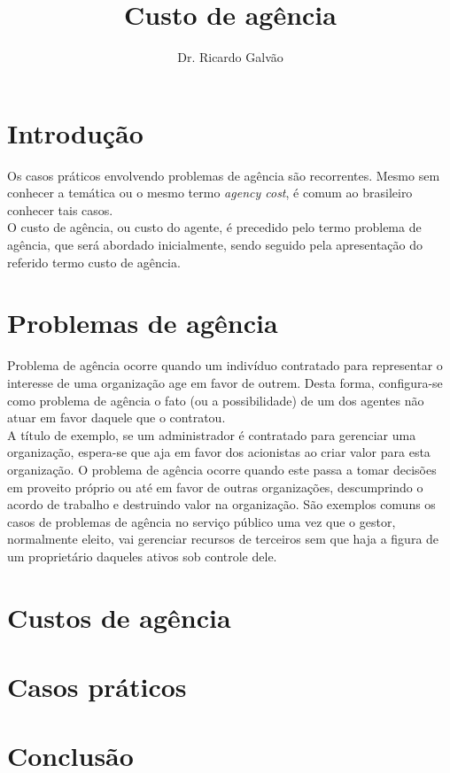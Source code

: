\documentclass[jou,apacite]{apa6}
\title{Custo de agência}
\author{Dr. Ricardo Galvão}
\affiliation{https://github.com/rcgalvao/financas}
\begin{document}
\maketitle    
                        
\section{Introdução}
Os casos práticos envolvendo problemas de agência são recorrentes. Mesmo sem conhecer a temática ou o mesmo termo \textit{agency cost}, é comum ao brasileiro conhecer tais casos. \\
O custo de agência, ou custo do agente, é precedido pelo termo problema de agência, que será abordado inicialmente, sendo seguido pela apresentação do referido termo custo de agência.\\


\section{Problemas de agência}
Problema de agência ocorre quando um indivíduo contratado para representar o interesse de uma organização age em favor de outrem. Desta forma, configura-se como problema de agência o fato (ou a possibilidade) de um dos agentes não atuar em favor daquele que o contratou.  \\
A título de exemplo, se um administrador é contratado para gerenciar uma organização, espera-se que aja em favor dos acionistas ao criar valor para esta organização. O problema de agência ocorre quando este passa a tomar decisões em proveito próprio ou até em favor de outras organizações, descumprindo o acordo de trabalho e destruindo valor na organização. São exemplos comuns os casos de problemas de agência no serviço público uma vez que o gestor, normalmente eleito, vai gerenciar recursos de terceiros sem que haja a figura de um proprietário daqueles ativos sob controle dele. 

\section{Custos de agência}


\section{Casos práticos}


\section{Conclusão}
\end{document}
